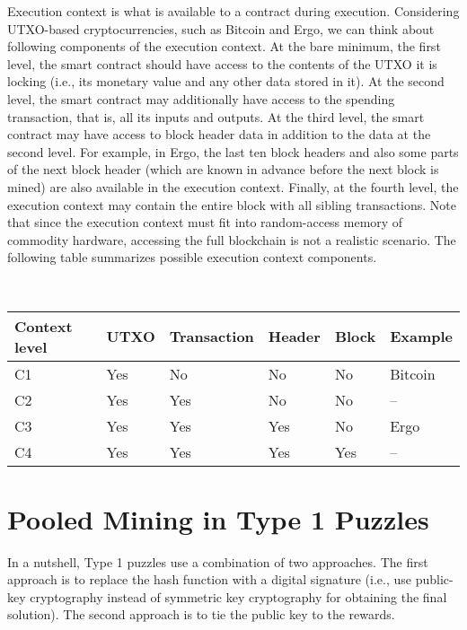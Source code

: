\documentclass{llncs}
\begin{document}
Execution context is what is available to a contract during execution. Considering UTXO-based cryptocurrencies, such as
Bitcoin and Ergo, we can think about following components of the execution context. At the bare minimum, the first level, the smart contract 
 should have access to the contents of the UTXO it is locking (i.e., its monetary value and any other data stored in it). At the second level, the smart contract may additionally have access to the spending transaction, that is, all its inputs and outputs. At the third level, the smart contract may have access to block header data in addition to the data at the second level. For example, in Ergo, the last ten block headers and also some parts of the next block header 
 (which are known in advance before the next block is mined) are also available in the execution context. Finally, at the fourth level, the execution context may contain the entire block with all sibling transactions. Note that since the execution context must fit into random-access memory of commodity hardware, accessing the full blockchain is not a realistic scenario. The following
 table summarizes possible execution context components.

~\\
\begin{tabular}{|l|l|l|l|l|l|}\hline
	Context level & UTXO & Transaction & Header      & Block & Example \\ \hline
	 C1     & Yes  & No          & No  		   & No    & Bitcoin~\cite{Nak08} \\
	 C2     & Yes & Yes         & No 		   & No    & -- \\
	 C3     & Yes & Yes         & Yes 		   & No    & Ergo ~\cite{ergo}   \\
	 C4     & Yes & Yes         & Yes 		   & Yes   & --    \\\hline
\end{tabular}
	
\section{Pooled Mining in Type 1 Puzzles}
\label{bypasstype1}

In a nutshell, Type 1 puzzles use a combination of two approaches. The first approach is to replace the hash function with a digital signature (i.e., use public-key cryptography instead of symmetric key cryptography for obtaining the final solution). The second approach is to tie the public key to the rewards. 
\end{document}
